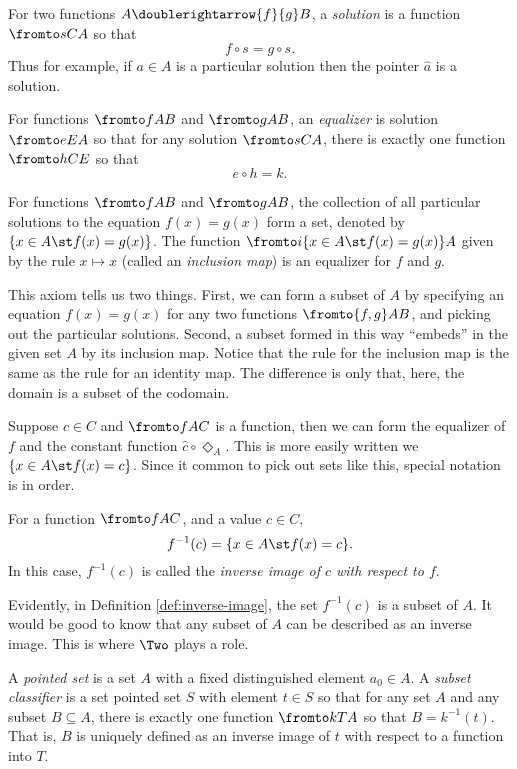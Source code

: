 \begin{defn} 
	For two functions $A\doublerightarrow{f}{g} B$, a \emph{solution} is a function $\fromto sCA$ so that 
	\[f\circ s = g\circ s.\]
	Thus for example, if $a\in A$ is a particular solution then the pointer $\hat a$ is a solution. 

	For functions $\fromto fAB$ and $\fromto gAB$, an \emph{equalizer} is solution $\fromto eEA$ so that for any solution $\fromto sCA$, there is exactly one function $\fromto hCE$ so that \[e\circ h = k.\]
\end{defn}

\begin{axiom}
	For functions $\fromto fAB$ and $\fromto gAB$, the collection of all particular solutions to the equation $f(x)=g(x)$ form a set, denoted by $\{x\in A\st f(x) = g(x)\}$. 
	The function $\fromto i{\{x\in A\st f(x)=g(x)\}}A$ given by the rule $x\mapsto x$ (called an \emph{inclusion map}) is an equalizer for $f$ and $g$.
\end{axiom}

This axiom tells us two things.
First, we can form a subset of $A$ by specifying an equation $f(x)=g(x)$ for any two functions $\fromto {f,g}AB$, and picking out the particular solutions.
Second, a subset formed in this way ``embeds'' in the given set $A$ by its inclusion map.
Notice that the rule for the inclusion map is the same as the rule for an identity map. 
The difference is only that, here, the domain is a subset of the codomain.

Suppose $c\in C$ and $\fromto fAC$ is a function, then we can form the equalizer of $f$ and the constant function $\hat{c}\circ\Diamond_A$.
This is more easily written we $\{x\in A\st f(x)=c\}$. Since it common to pick out sets like this, special notation is in order.

\begin{defn}\label{def:inverse-image}
	For a function $\fromto fAC$, and a value $c\in C$, 
	\[f^{-1}(c) = \{x\in A\st f(x)=c\}.\] 
	In this case, $f^{-1}(c)$ is called the \emph{inverse image of $c$ with respect to $f$}.
\end{defn}

Evidently, in Definition \ref{def:inverse-image}, the set $f^{-1}(c)$ is a subset of $A$. It would be good to know that any subset of $A$ can be described as an inverse image.
This is where $\Two$ plays a role.

\begin{defn}
	A \emph{pointed set} is a set $A$ with a fixed distinguished element $a_0\in A$.
	A \emph{subset classifier} is a set pointed set $S$ with element $t\in S$ so that for any set $A$ and any subset $B\subseteq A$, there is exactly one function $\fromto kTA$ so that $B = k^{-1}(t)$.
	That is, $B$ is uniquely defined as an inverse image of $t$ with respect to a function into $T$.
\end{defn}

